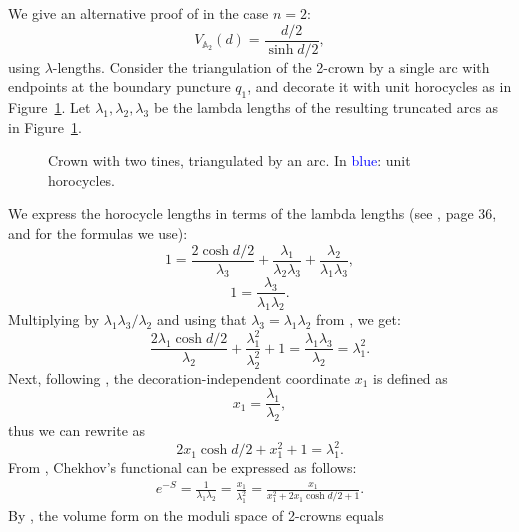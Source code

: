 \documentclass{amsart}
\newcommand{\figref}[1]{Figure~\ref{#1}}
\theoremstyle{definition}
\begin{document}
We give an alternative proof of  in the case $n=2$:
\[
V_{\mathbb{A}_{2}}(d) = \frac{d/2}{\sinh{d/2}},
\]
using $\lambda$-lengths. Consider the triangulation of the 2-crown by a single arc with endpoints at the boundary puncture $q_1$, and decorate it with unit horocycles as in \figref{fig:2-tines-lambda-lengths}. Let $\lambda_1, \lambda_2,  \lambda_3$ be the lambda lengths of the resulting truncated arcs as in \figref{fig:2-tines-lambda-lengths}. 
\begin{figure}[H]
    \centering
    
    \caption{Crown with two tines, triangulated by an arc. In \textcolor{blue}{blue}: unit horocycles.}
    \label{fig:2-tines-lambda-lengths}
\end{figure}
We express the horocycle lengths in terms of the lambda lengths (see \cite[Lemma~4.9]{pennerbook}, page 36, and \cite[Note~3.4]{huang_thesis} for the formulas we use):
\begin{equation}
\label{eq:2-tine-crown-hor-cond-1}
1 = \frac{2\cosh{d/2}}{\lambda_3} + \frac{\lambda_1}{\lambda_2\lambda_3}+\frac{\lambda_2}{\lambda_1\lambda_3},
\end{equation}
\begin{equation}
\label{eq:2-tine-crown-hor-cond-2}
1 = \frac{\lambda_3}{\lambda_1 \lambda_2}.
\end{equation}
Multiplying  by $\lambda_1\lambda_3/\lambda_2$ and using that $\lambda_3 = \lambda_1 \lambda_2$ from , we get:
\begin{equation}
\label{eq:2-tine-crown-hor-cond-3}
\frac{2\lambda_1\cosh{d/2}}{\lambda_2} + \frac{\lambda_1^2}{\lambda_2^2}+1 = \frac{\lambda_1\lambda_3}{\lambda_2} = \lambda_1^2.
\end{equation}
Next, following \cite[Page~9]{chekhov2024}, the decoration-independent coordinate $x_1$ is defined as 
\[
x_1 = \frac{\lambda_1}{\lambda_2},
\]
thus we can rewrite  as
\begin{equation}
\label{eq:2-tine-crown-hor-cond-4}
2x_1 \cosh d/2 + x_1^2+1 =  \lambda_1^2.
\end{equation} 
From , Chekhov's functional can be expressed as follows:
\begin{align*}
e^{-S} = \frac{1}{\lambda_1\lambda_2} = \frac{x_1}{\lambda_1^2} = \frac{x_1}{x_1^2+2x_1 \cosh d/2+1}.
\end{align*}
By \cite[Lemma~2.2]{chekhov2024}, the volume form on the moduli space of 2-crowns equals 
\end{document}
